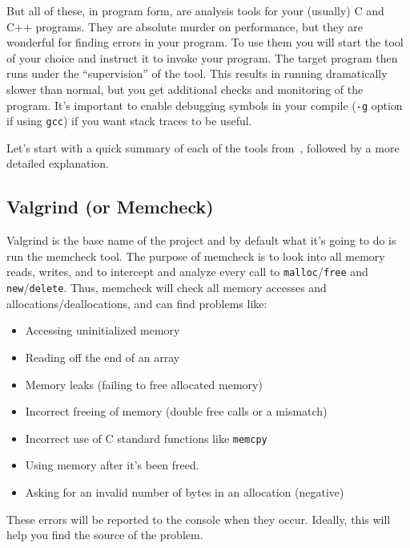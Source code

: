 \documentclass[a4paper]{report}
\begin{document}
But all of these, in program form, are analysis tools for your (usually) C and C++ programs. They are absolute murder on performance, but they are wonderful for finding errors in your program. To use them you will start the tool of your choice and instruct it to invoke your program. The target program then runs under the ``supervision'' of the tool. This results in running dramatically slower than normal, but you get additional checks and monitoring of the program. It's important to enable debugging symbols in your compile (\texttt{-g} option if using \texttt{gcc}) if you want stack traces to be useful.

Let's start with a quick summary of each of the tools from~\cite{valgrind:tools}, followed by a more detailed explanation.

\subsection*{Valgrind (or Memcheck) }
Valgrind is the base name of the project and by default what it's going to do is run the memcheck tool. The purpose of memcheck is to look into all memory reads, writes, and to intercept and analyze every call to \texttt{malloc}/\texttt{free} and \texttt{new}/\texttt{delete}. Thus, memcheck will check all memory accesses and allocations/deallocations, and can find problems like:
\begin{itemize}
	\item Accessing uninitialized memory
	\item Reading off the end of an array
	\item Memory leaks (failing to free allocated memory)
	\item Incorrect freeing of memory (double free calls or a mismatch)
	\item Incorrect use of C standard functions like \texttt{memcpy}
	\item Using memory after it's been freed.
	\item Asking for an invalid number of bytes in an allocation (negative\textinterrobang)
\end{itemize}

These errors will be reported to the console when they occur. Ideally, this will help you find the source of the problem. 
\end{document}
